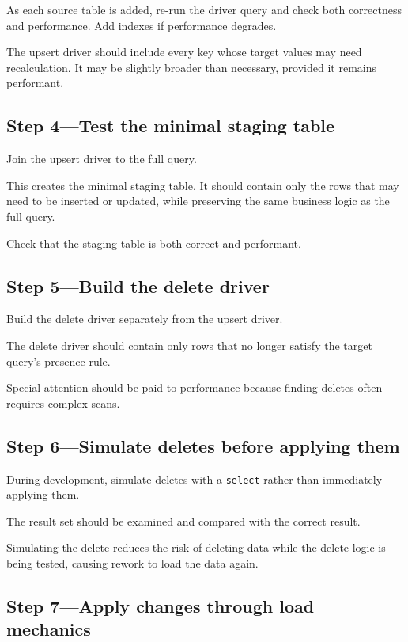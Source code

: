 \documentclass[10pt,openany,10pt]{book}
\begin{document}
As each source table is added, re-run the driver query and check both
correctness and performance. Add indexes if performance degrades.

The upsert driver should include every key whose target values may need
recalculation. It may be slightly broader than necessary, provided it
remains performant.

\subsection{Step 4---Test the minimal staging
table}\label{step-4test-the-minimal-staging-table}

Join the upsert driver to the full query.

This creates the minimal staging table. It should contain only the rows
that may need to be inserted or updated, while preserving the same
business logic as the full query.

Check that the staging table is both correct and performant.

\subsection{Step 5---Build the delete
driver}\label{step-5build-the-delete-driver}

Build the delete driver separately from the upsert driver.

The delete driver should contain only rows that no longer satisfy the
target query's presence rule.

Special attention should be paid to performance because finding deletes
often requires complex scans.

\subsection{Step 6---Simulate deletes before applying
them}\label{step-6simulate-deletes-before-applying-them}

During development, simulate deletes with a \texttt{select} rather than
immediately applying them.

The result set should be examined and compared with the correct result.

Simulating the delete reduces the risk of deleting data while the delete
logic is being tested, causing rework to load the data again.

\subsection{Step 7---Apply changes through load
mechanics}\label{step-7apply-changes-through-load-mechanics}
\end{document}
